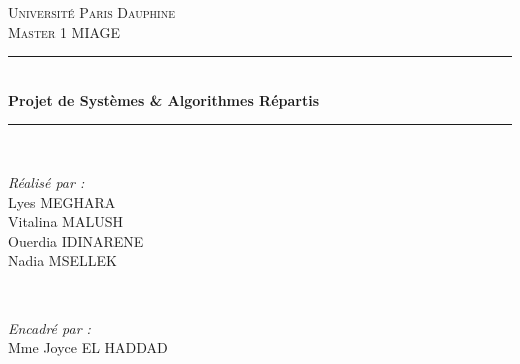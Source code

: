 \documentclass[11pt]{article}
\begin{document}

\begin{titlepage}
	\newcommand{\HRule}{\rule{\linewidth}{0.5mm}} 
	
	\center
	
	
	\textsc{\LARGE Université Paris Dauphine}\\[1.5cm] 
	
	\textsc{\Large Master 1 MIAGE}\\[0.5cm] 
	

	
	
	\HRule\\[0.4cm]
	
	{\huge\bfseries Projet de Systèmes \& Algorithmes Répartis}\\[0.4cm]
	
	\HRule\\[2.5cm]
	
	
	\begin{minipage}{0.4\textwidth}
		\begin{flushleft}
			\large
			\textit{Réalisé par :}\\
			Lyes \textsc{MEGHARA}\\ 
			Vitalina \textsc{MALUSH}\\ 
			Ouerdia \textsc{IDINARENE}\\ 
			Nadia \textsc{MSELLEK}\\ 
		\end{flushleft}
	\end{minipage}
	~
	\begin{minipage}{0.4\textwidth}
		\begin{flushright}
			\large
			\textit{Encadré par :}\\
			Mme Joyce \textsc{EL HADDAD}%

		\end{flushright}
	\end{minipage}
	


\end{titlepage}
\end{document}
